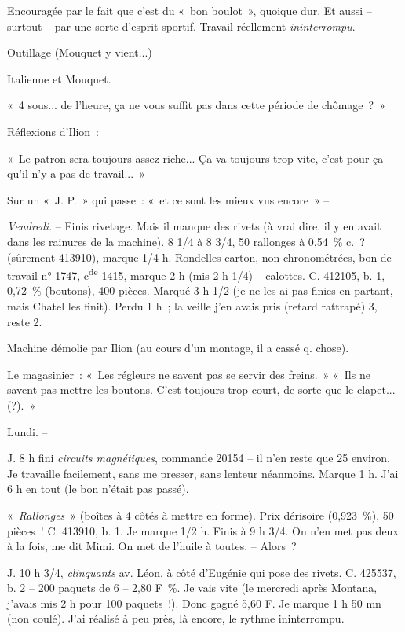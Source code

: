 \documentclass[french,twoside]{book} %
\begin{document}
Encouragée par le fait que c'est du « bon boulot », quoique dur. Et aussi – surtout – par une sorte d'esprit sportif. Travail réellement {\itshape ininterrompu}.\par
Outillage (Mouquet y vient...)\par
Italienne et Mouquet.\par
« 4 sous... de l'heure, ça ne vous suffit pas dans cette période de chômage ? »\par
Réflexions d'Ilion :\par
« Le patron sera toujours assez riche... Ça va toujours trop vite, c'est pour ça qu'il n'y a pas de travail... »\par
Sur un « J. P. » qui passe : « et ce sont les mieux vus encore » –\par
\par
{\itshape Vendredi}. – Finis rivetage. Mais il manque des rivets (à vrai dire, il y en avait dans les rainures de la machine). 8 1/4 à 8 3/4, 50 rallonges à 0,54 \% c. ? (sûrement 413910), marque 1/4 h. Rondelles carton, non chronométrées, bon de travail n° 1747, c\textsuperscript{de} 1415, marque 2 h (mis 2 h 1/4) – calottes. C. 412105, b. 1, 0,72 \% (boutons), 400 pièces. Marqué 3 h 1/2 (je ne les ai pas finies en partant, mais Chatel les finit). Perdu 1 h ; la veille j'en avais pris (retard rattrapé) 3, reste 2.\par
Machine démolie par Ilion (au cours d'un montage, il a cassé q. chose).\par
Le magasinier : « Les régleurs ne savent pas se servir des freins. » « Ils ne savent pas mettre les boutons. C'est toujours trop court, de sorte que le clapet... (?). »\par
Lundi. –\par
J. 8 h fini {\itshape circuits magnétiques}, commande 20154 – il n'en reste que 25 environ. Je travaille facilement, sans me presser, sans lenteur néanmoins. Marque 1 h. J'ai 6 h en tout (le bon n'était pas passé).\par
« {\itshape Rallonges} » (boîtes à 4 côtés à mettre en forme). Prix dérisoire (0,923 \%), 50 pièces ! C. 413910, b. 1. Je marque 1/2 h. Finis à 9 h 3/4. On n'en met pas deux à la fois, me dit Mimi. On met de l'huile à toutes. – Alors ?\par
J. 10 h 3/4, {\itshape clinquants} av. Léon, à côté d'Eugénie qui pose des rivets. C. 425537, b. 2 – 200 paquets de 6 – 2,80 F \%. Je vais vite (le mercredi après Montana, j'avais mis 2 h pour 100 paquets !). Donc gagné 5,60 F. Je marque 1 h 50 mn (non coulé). J'ai réalisé à peu près, là encore, le rythme ininterrompu.\par
\end{document}
